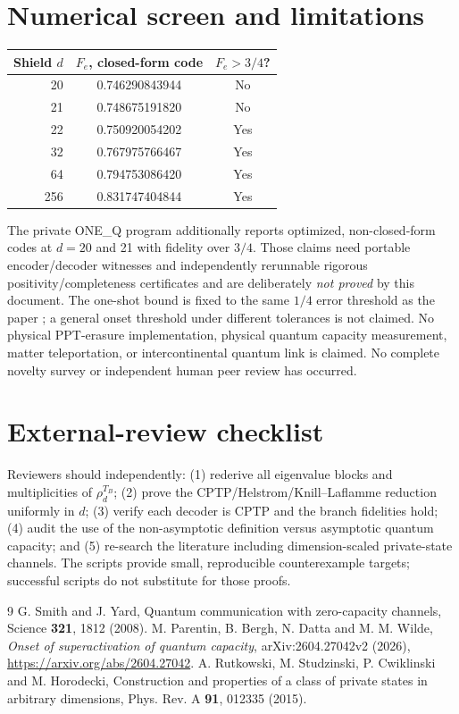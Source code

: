 \documentclass[11pt]{article}
\begin{document}
\section{Numerical screen and limitations}
\begin{center}\begin{tabular}{rcc}\toprule Shield $d$ & $F_e$, closed-form code & $F_e>3/4$?\\\midrule
20 &0.746290843944&No\\
21 &0.748675191820&No\\
22 &0.750920054202&Yes\\
32 &0.767975766467&Yes\\
64 &0.794753086420&Yes\\
256 &0.831747404844&Yes\\\bottomrule\end{tabular}\end{center}
The private ONE\_Q program additionally reports optimized, non-closed-form codes at $d=20$ and 21 with fidelity over $3/4$. Those claims need portable encoder/decoder witnesses and independently rerunnable rigorous positivity/completeness certificates and are deliberately \emph{not proved} by this document. The one-shot bound is fixed to the same $1/4$ error threshold as the paper \cite{parentin}; a general onset threshold under different tolerances is not claimed. No physical PPT-erasure implementation, physical quantum capacity measurement, matter teleportation, or intercontinental quantum link is claimed. No complete novelty survey or independent human peer review has occurred.

\section{External-review checklist}
Reviewers should independently: (1) rederive all eigenvalue blocks and multiplicities of $\rho_d^{T_B}$; (2) prove the CPTP/Helstrom/Knill--Laflamme reduction uniformly in $d$; (3) verify each decoder is CPTP and the branch fidelities hold; (4) audit the use of the non-asymptotic definition versus asymptotic quantum capacity; and (5) re-search the literature including dimension-scaled private-state channels. The scripts provide small, reproducible counterexample targets; successful scripts do not substitute for those proofs.

\begin{thebibliography}{9}
 G. Smith and J. Yard, Quantum communication with zero-capacity channels, Science \textbf{321}, 1812 (2008).
 M. Parentin, B. Bergh, N. Datta and M. M. Wilde, \emph{Onset of superactivation of quantum capacity}, arXiv:2604.27042v2 (2026), \url{https://arxiv.org/abs/2604.27042}.
 A. Rutkowski, M. Studzinski, P. Cwiklinski and M. Horodecki, Construction and properties of a class of private states in arbitrary dimensions, Phys. Rev. A \textbf{91}, 012335 (2015).
\end{thebibliography}
\end{document}
